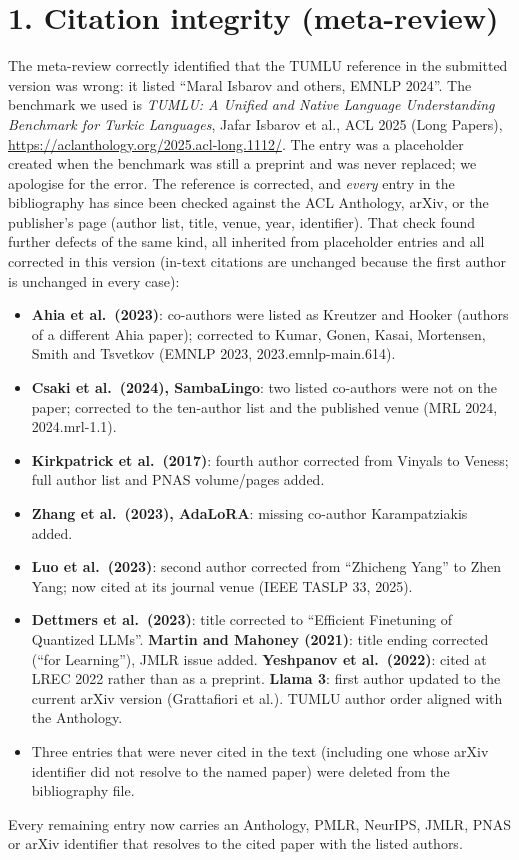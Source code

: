 \documentclass[11pt]{article}
\begin{document}
\section*{1. Citation integrity (meta-review)}
The meta-review correctly identified that the TUMLU reference in the
submitted version was wrong: it listed ``Maral Isbarov and others, EMNLP
2024''. The benchmark we used is
\emph{TUMLU: A Unified and Native Language Understanding Benchmark for Turkic
Languages}, Jafar Isbarov et al., ACL 2025 (Long Papers),
\url{https://aclanthology.org/2025.acl-long.1112/}. The entry was a
placeholder created when the benchmark was still a preprint and was never
replaced; we apologise for the error. The reference is corrected, and
\emph{every} entry in the bibliography has since been checked against the
ACL Anthology, arXiv, or the publisher's page (author list, title, venue,
year, identifier). That check found further defects of the same kind, all
inherited from placeholder entries and all corrected in this version
(in-text citations are unchanged because the first author is unchanged in
every case):
\begin{itemize}
\item \textbf{Ahia et al.\ (2023)}: co-authors were listed as Kreutzer and
Hooker (authors of a different Ahia paper); corrected to Kumar, Gonen,
Kasai, Mortensen, Smith and Tsvetkov (EMNLP 2023, 2023.emnlp-main.614).
\item \textbf{Csaki et al.\ (2024), SambaLingo}: two listed co-authors were
not on the paper; corrected to the ten-author list and the published venue
(MRL 2024, 2024.mrl-1.1).
\item \textbf{Kirkpatrick et al.\ (2017)}: fourth author corrected from Vinyals
to Veness; full author list and PNAS volume/pages added.
\item \textbf{Zhang et al.\ (2023), AdaLoRA}: missing co-author Karampatziakis
added.
\item \textbf{Luo et al.\ (2023)}: second author corrected from ``Zhicheng
Yang'' to Zhen Yang; now cited at its journal venue (IEEE TASLP 33, 2025).
\item \textbf{Dettmers et al.\ (2023)}: title corrected to ``Efficient
Finetuning of Quantized LLMs''. \textbf{Martin and Mahoney (2021)}: title
ending corrected (``for Learning''), JMLR issue added.
\textbf{Yeshpanov et al.\ (2022)}: cited at LREC 2022 rather than as a
preprint. \textbf{Llama 3}: first author updated to the current arXiv
version (Grattafiori et al.). TUMLU author order aligned with the Anthology.
\item Three entries that were never cited in the text (including one whose
arXiv identifier did not resolve to the named paper) were deleted from the
bibliography file.
\end{itemize}
Every remaining entry now carries an Anthology, PMLR, NeurIPS, JMLR, PNAS
or arXiv identifier that resolves to the cited paper with the listed
authors.
\end{document}
